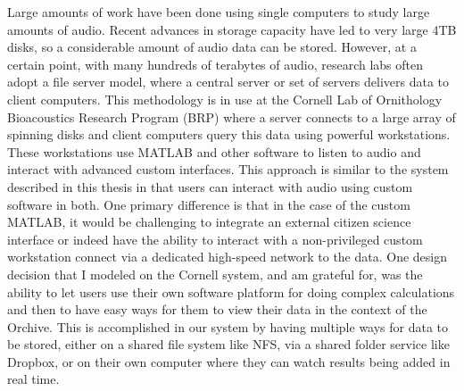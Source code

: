 \documentclass[12pt,oneside]{book}
\begin{document}
Large amounts of work have been done using single computers to study
large amounts of audio.  Recent advances in storage capacity have led
to very large 4TB disks, so a considerable amount of audio data can be
stored.  However, at a certain point, with many hundreds of terabytes
of audio, research labs often adopt a file server model, where a
central server or set of servers delivers data to client computers.
This methodology is in use at the Cornell Lab of Ornithology
Bioacoustics Research Program (BRP) \cite{clark2012dcl} where a server
connects to a large array of spinning disks and client computers query
this data using powerful workstations.  These workstations use MATLAB
and other software to listen to audio and interact with advanced
custom interfaces.  This approach is similar to the system described
in this thesis in that users can interact with audio using custom
software in both.  One primary difference is that in the case of the
custom MATLAB, it would be challenging to integrate an external
citizen science interface or indeed have the ability to interact with
a non-privileged custom workstation connect via a dedicated high-speed
network to the data.  One design decision that I modeled on the
Cornell system, and am grateful for, was the ability to let users use
their own software platform for doing complex calculations and then
to have easy ways for them to view their data in the context of the
Orchive.  This is accomplished in our system by having multiple ways
for data to be stored, either on a shared file system like NFS, via a
shared folder service like Dropbox, or on their own computer where
they can watch results being added in real time.
\end{document}
